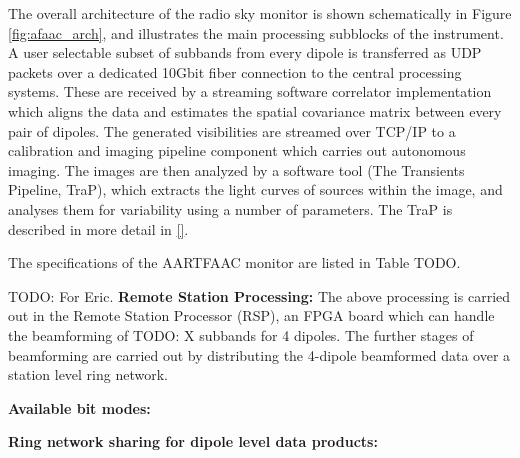 \documentclass{aa}
\begin{document}
The overall  architecture of  the radio  sky monitor  is shown  schematically in
Figure \ref{fig:afaac_arch},  and illustrates  the main processing  subblocks of
the  instrument. A  user  selectable subset  of subbands  from  every dipole  is
transferred  as UDP  packets over  a dedicated  10Gbit fiber  connection to  the
central  processing  systems.  These  are   received  by  a  streaming  software
correlator  implementation  which aligns  the  data  and estimates  the  spatial
covariance matrix between every pair of dipoles.  The generated visibilities are
streamed  over TCP/IP  to a  calibration  and imaging  pipeline component  which
carries out autonomous imaging.  The images are then analyzed by a software tool
(The  Transients Pipeline,  TraP), which  extracts the  light curves  of sources
within  the  image,  and  analyses  them  for  variability  using  a  number  of
parameters. The TraP is described in more detail in \ref{}.

The specifications of the AARTFAAC monitor are listed in Table TODO.

TODO: For  Eric.
\textbf {Remote Station Processing:} The above  processing is carried out in the
Remote Station Processor  (RSP), an FPGA board which can  handle the beamforming
of TODO: X subbands for 4 dipoles. The further stages of beamforming are carried
out  by distributing  the 4-dipole  beamformed data  over a  station level  ring
network.

\textbf {Available bit modes:} 

\textbf {Ring network sharing for dipole level data products:}
\end{document}
